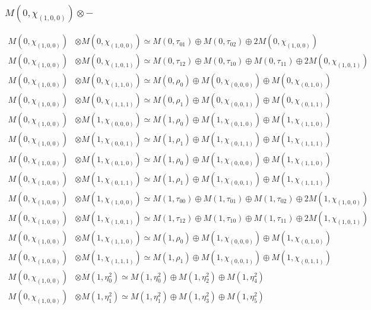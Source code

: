 \subsubsection{$ M(0,\chi_{(1,0,0)})\otimes -$}
\begin{align*}
M(0,\chi_{(1,0,0)}) &\otimes M(0,\chi_{(1,0,0)}) \simeq M(0,\tau_{01}) \oplus M(0,\tau_{02}) \oplus 2 M(0,\chi_{(1,0,0)}) \\
M(0,\chi_{(1,0,0)}) &\otimes M(0,\chi_{(1,0,1)}) \simeq M(0,\tau_{12}) \oplus M(0,\tau_{10}) \oplus M(0,\tau_{11}) \oplus 2 M(0,\chi_{(1,0,1)}) \\
M(0,\chi_{(1,0,0)}) &\otimes M(0,\chi_{(1,1,0)}) \simeq M(0,\rho_{0}) \oplus M(0,\chi_{(0,0,0)}) \oplus M(0,\chi_{(0,1,0)}) \\
M(0,\chi_{(1,0,0)}) &\otimes M(0,\chi_{(1,1,1)}) \simeq M(0,\rho_{1}) \oplus M(0,\chi_{(0,0,1)}) \oplus M(0,\chi_{(0,1,1)}) \\
M(0,\chi_{(1,0,0)}) &\otimes M(1,\chi_{(0,0,0)}) \simeq M(1,\rho_{0}) \oplus M(1,\chi_{(0,1,0)}) \oplus M(1,\chi_{(1,1,0)}) \\
M(0,\chi_{(1,0,0)}) &\otimes M(1,\chi_{(0,0,1)}) \simeq M(1,\rho_{1}) \oplus M(1,\chi_{(0,1,1)}) \oplus M(1,\chi_{(1,1,1)}) \\
M(0,\chi_{(1,0,0)}) &\otimes M(1,\chi_{(0,1,0)}) \simeq M(1,\rho_{0}) \oplus M(1,\chi_{(0,0,0)}) \oplus M(1,\chi_{(1,1,0)}) \\
M(0,\chi_{(1,0,0)}) &\otimes M(1,\chi_{(0,1,1)}) \simeq M(1,\rho_{1}) \oplus M(1,\chi_{(0,0,1)}) \oplus M(1,\chi_{(1,1,1)}) \\
M(0,\chi_{(1,0,0)}) &\otimes M(1,\chi_{(1,0,0)}) \simeq M(1,\tau_{00}) \oplus M(1,\tau_{01}) \oplus M(1,\tau_{02}) \oplus 2 M(1,\chi_{(1,0,0)}) \\
M(0,\chi_{(1,0,0)}) &\otimes M(1,\chi_{(1,0,1)}) \simeq M(1,\tau_{12}) \oplus M(1,\tau_{10}) \oplus M(1,\tau_{11}) \oplus 2 M(1,\chi_{(1,0,1)}) \\
M(0,\chi_{(1,0,0)}) &\otimes M(1,\chi_{(1,1,0)}) \simeq M(1,\rho_{0}) \oplus M(1,\chi_{(0,0,0)}) \oplus M(1,\chi_{(0,1,0)}) \\
M(0,\chi_{(1,0,0)}) &\otimes M(1,\chi_{(1,1,1)}) \simeq M(1,\rho_{1}) \oplus M(1,\chi_{(0,0,1)}) \oplus M(1,\chi_{(0,1,1)}) \\
M(0,\chi_{(1,0,0)}) &\otimes M(1,\eta^{2}_{0}) \simeq M(1,\eta^{2}_{0}) \oplus M(1,\eta^{2}_{2}) \oplus M(1,\eta^{2}_{4}) \\
M(0,\chi_{(1,0,0)}) &\otimes M(1,\eta^{2}_{1}) \simeq M(1,\eta^{2}_{1}) \oplus M(1,\eta^{2}_{3}) \oplus M(1,\eta^{2}_{5}) \\

\end{align*}
